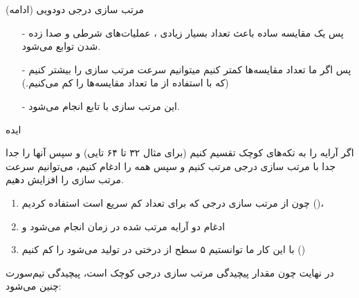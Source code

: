 \begin{frame}{مرتب سازی درجی دودویی (ادامه)}
\begin{itemize}\itemr
\item[-]
پس یک مقایسه ساده باعث تعداد بسیار زیادی ، عملیات‌های شرطی و صدا زده شدن توابع می‌شود.

\item[-]
پس اگر ما تعداد مقایسه‌ها کمتر کنیم میتوانیم سرعت مرتب سازی را بیشتر کنیم (که با استفاده از  ما تعداد مقایسه‌ها را کم می‌کنیم.)

\item[-]
این مرتب‌ سازی با تابع 
انجام می‌شود.
\end{itemize}
\end{frame}

\begin{frame}{ایده}
\begin{center}
{\large اگر آرایه را به تکه‌های کوچک تقسیم کنیم‌ (برای مثال ۳۲ تا ۶۴ تایی) و سپس آنها را جدا جدا با مرتب‌ سازی درجی مرتب کنیم و سپس همه را ادغام کنیم، می‌توانیم سرعت مرتب سازی را افزایش دهیم.}
\end{center}

\begin{enumerate}\itemr
\item
چون از مرتب سازی درجی که برای تعداد کم سریع است استفاده کردیم ()،
\item
ادغام دو آرایه مرتب شده در زمان 
انجام می‌شود و

\item 
با این کار ما توانستیم ۵ سطح از درختی در  تولید می‌شود را کم کنیم ()
\end{enumerate}

\begin{center}
{\large در نهایت چون مقدار پیچیدگی مرتب سازی درجی کوچک است، پیچیدگی  تیم‌سورت چنین می‌شود: }
\end{center}
\end{frame}

